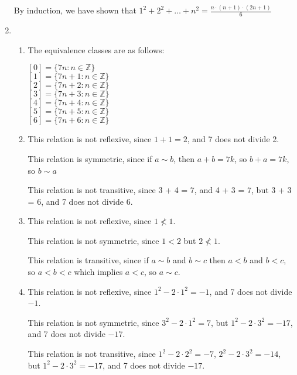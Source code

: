 \documentclass{article}
\begin{document}
\begin{enumerate}
        By induction, we have shown that $1^2 + 2^2 + \dots + n^2 = \frac{n \cdot (n+1) \cdot (2n + 1)}{6}$
    
        \rightline\qedsymbol

    \item 
        \begin{enumerate}
            \item The equivalence classes are as follows:

            $[0] = \{7n : n \in \mathbb{Z}\}$ \\
            $[1] = \{7n + 1: n \in \mathbb{Z}\}$ \\
            $[2] = \{7n + 2: n \in \mathbb{Z}\}$ \\
            $[3] = \{7n + 3: n \in \mathbb{Z}\}$ \\
            $[4] = \{7n + 4: n \in \mathbb{Z}\}$ \\
            $[5] = \{7n + 5: n \in \mathbb{Z}\}$ \\
            $[6] = \{7n + 6: n \in \mathbb{Z}\}$

            \item 
            This relation is not reflexive, since $1 + 1 = 2$, and 7 does not divide 2.

            This relation is symmetric, since if $a \sim b$, then $a + b = 7k$, so $b + a =7k$, so $b \sim a$ 

            This relation is not transitive, since 3 + 4 = 7, and 4 + 3 = 7, but 3 + 3 = 6, and 7 does not divide 6. 

            \item 
            This relation is not reflexive, since $1 \nless 1$.

            This relation is not symmetric, since $1 < 2$ but $2 \nless 1$. 

            This relation is transitive, since if $a \sim b$ and $b \sim c$ then $a < b$ and $b < c$, so $a < b < c$ which implies $a < c$, so $a \sim c$.

            \item 
            This relation is not reflexive, since $1^2 - 2\cdot 1^2 = -1$, and 7 does not divide $-1$.

            This relation is not symmetric, since $3^2 - 2 \cdot 1^2 = 7$, but $1^2 - 2 \cdot 3^2 = -17$, and 7 does not divide $-17$.

            This relation is not transitive, since $1^2 - 2 \cdot 2^2 = -7$, $2^2 - 2 \cdot 3^2 = -14$, but $1^2 - 2 \cdot 3^2 =-17$, and 7 does not divide $-17$. 
        \end{enumerate}


\end{enumerate}
\end{document}
